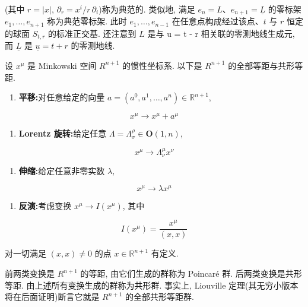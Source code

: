 (其中 $r = |x|$, $\partial_{r} = x^{i}/r\, \partial_{i}$)称为典范的. 类似地, 满足 $e_{n} = L$、$e_{n+1} = \underline{L}$ 的零标架 $e_{1}, \ldots, e_{n+1}$ 称为典范零标架. 此时 $e_{1}, \ldots, e_{n-1}$ 在任意点构成经过该点、$t$ 与 $r$ 恒定的球面 $S_{t, r}$ 的标准正交基. 还注意到 $L$ 是与 u = t - r 相关联的零测地线生成元, 而 $\underline{L}$ 是 $\underline{u} = t + r$ 的零测地线.


设 $x^{\mu}$ 是 Minkowski 空间 $R^{n+1}$ 的惯性坐标系. 以下是 $R^{n+1}$ 的全部等距与共形等距.

\begin{enumerate}
\renewcommand{\labelenumi}{\arabic{enumi}.}
\item \textbf{平移:}对任意给定的向量 $a = (a^{0}, a^{1}, \ldots, a^{n}) \in \mathbb{R}^{n+1}$,
\end{enumerate}

\[
x^{\mu} \rightarrow x^{\mu} + a^{\mu}
\]

\begin{enumerate}
\renewcommand{\labelenumi}{\arabic{enumi}.}
\setcounter{enumi}{1}
\item \textbf{Lorentz 旋转:}给定任意 $\Lambda = \Lambda_{\sigma}^{\rho} \in \mathbf{O}(1, n)$,
\end{enumerate}

\[
x^{\mu} \to \Lambda_{\nu}^{\mu}x^{\nu}
\]

\begin{enumerate}
\renewcommand{\labelenumi}{\arabic{enumi}.}
\setcounter{enumi}{2}
\item \textbf{伸缩:}给定任意非零实数 $\lambda$,
\end{enumerate}

\[
x^{\mu} \rightarrow \lambda x^{\mu}
\]

\begin{enumerate}
\renewcommand{\labelenumi}{\arabic{enumi}.}
\setcounter{enumi}{3}
\item \textbf{反演:}考虑变换 $x^{\mu} \rightarrow I(x^{\mu})$, 其中
\end{enumerate}

\[
I(x^{\mu}) = \frac{x^{\mu}}{(x, x)}
\]

对一切满足 $(x, x) \neq 0$ 的点 $x \in \mathbb{R}^{n+1}$ 有定义.

前两类变换是 $R^{n+1}$ 的等距, 由它们生成的群称为 Poincaré 群. 后两类变换是共形等距. 由上述所有变换生成的群称为共形群. 事实上, Liouville 定理(其无穷小版本将在后面证明)断言它就是 $R^{n+1}$ 的全部共形等距群.

